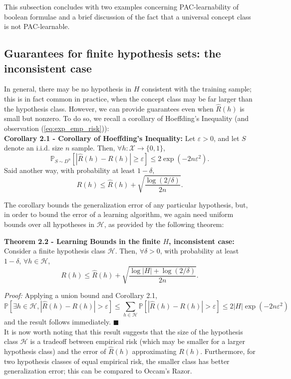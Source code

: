 \documentclass[10pt]{article}
\renewcommand{\qed}{\quad \ensuremath{\blacksquare}}    %
\renewcommand{\H}{\mathcal{H}}                      %
\newcommand{\e}{\varepsilon}                        %
\newcommand{\X}{\mathcal{X}}                        %
\newcommand{\pr}{\mathbb{P}}                        %
\renewcommand{\hat}{\widehat}
\begin{document}
This subsection concludes with two examples concerning PAC-learnability of
boolean formulae and a brief discussion of the fact that a universal concept
class is not PAC-learnable.

\subsection{Guarantees for finite hypothesis sets: the inconsistent case}
In general, there may be no hypothesis in $H$ consistent with the training
sample; this is in fact common in practice, when the concept class may be far
larger than the hypothesis class. However, we can provide guarantees even when
$\hat R(h)$ is small but nonzero. To do so, we recall a corollary of
Hoeffding's Inequality (and observation (\ref{eq:exp_emp_risk})):\\

{\bf Corollary 2.1 - Corollary of Hoeffding's Inequality:} Let $\e > 0$, and
let $S$ denote an i.i.d. size $n$ sample. Then, $\forall h : \X \to \{0,1\}$,
\[\pr_{S \sim D^n}\left[ |\hat R(h) - R(h)| \geq \e \right]
    \leq 2\exp(-2n\e^2).\]
Said another way, with probability at least $1 - \delta$,
\[R(h) \leq \hat R(h) + \sqrt{\frac{\log(2/\delta)}{2n}}.\]

The corollary bounds the generalization error of any particular hypothesis,
but, in order to bound the error of a learning algorithm, we again need uniform
bounds over all hypotheses in $\H$, as provided by the following theorem:

{\bf Theorem 2.2 - Learning Bounds in the finite $H$, inconsistent case:}
Consider a finite hypothesis class $\H$. Then, $\forall \delta > 0$, with
probability at least $1 - \delta$, $\forall h \in \H$,
\[R(h) \leq \hat R(h) + \sqrt{\frac{\log|H| + \log(2/\delta)}{2n}}.\]

\emph{Proof:} Applying a union bound and Corollary 2.1,
\[\pr\left[ \exists h \in \H, |\hat R(h) - R(h)| > \e \right]
    \leq \sum_{h \in \H} \pr\left[ |\hat R(h) - R(h)| > \e \right]
    \leq 2|H|\exp(-2n\e^2)
\]
and the result follows immediately. \qed \\

It is now worth noting that this result suggests that the size of the
hypothesis class $\H$ is a tradeoff between empirical risk (which may be
smaller for a larger hypothesis class) and the error of $\hat R(h)$
approximating $R(h)$. Furthermore, for two hypothesis classes of equal
empirical risk, the smaller class has better generalization error; this can be
compared to Occam's Razor.
\end{document}
